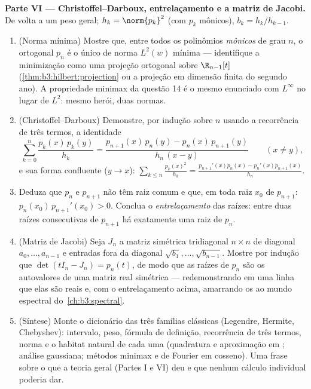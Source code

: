 \begin{problem}
\medskip
\noindent\textbf{Parte VI --- Christoffel--Darboux, entrelaçamento e a
matriz de Jacobi.} De volta a um peso geral; $h_k = \norm{p_k}^2$ (com $p_k$
mônicos), $b_k = h_k/h_{k-1}$.
\begin{enumerate}[resume]
  \item (Norma mínima) Mostre que, entre todos os polinômios
        \emph{mônicos} de grau $n$, o ortogonal $p_n$ é o único
        de norma $L^2(w)$ mínima --- identifique a minimização como
        uma projeção ortogonal sobre $\R_{n-1}[t]$ (\cref{thm:b3:hilbert:projection} ou a projeção
        em dimensão finita do segundo ano). A propriedade minimax da
        questão 14 é o mesmo enunciado com $L^\infty$ no lugar de $L^2$:
        mesmo herói, duas normas.
  \item (Christoffel--Darboux) Demonstre, por indução sobre $n$
        usando a recorrência de três termos, a identidade
        \[
        \sum_{k=0}^{n}\frac{p_k(x)\,p_k(y)}{h_k}
        = \frac{p_{n+1}(x)\,p_n(y) -
        p_n(x)\,p_{n+1}(y)}{h_n\,(x - y)}
        \qquad (x \neq y),
        \]
        e sua forma confluente ($y \to x$): $\sum_{k\leq n}\frac{p_k(x)^2}{h_k} =
        \frac{p_{n+1}'(x)p_n(x) - p_n'(x)p_{n+1}(x)}{h_n}$.
  \item Deduza que $p_n$ e $p_{n+1}$ não têm raiz comum e que, em toda
        raiz $x_0$ de $p_{n+1}$: $p_n(x_0)\,p_{n+1}'(x_0) > 0$. Conclua o \emph{entrelaçamento}
        das raízes: entre duas raízes consecutivas de $p_{n+1}$ há
        exatamente uma raiz de $p_n$.
  \item (Matriz de Jacobi) Seja $J_n$ a matriz simétrica
        tridiagonal $n\times n$ de diagonal $a_0,
        \dots, a_{n-1}$ e entradas fora da diagonal
        $\sqrt{b_1},
        \dots, \sqrt{b_{n-1}}$. Mostre por indução que $\det(tI_n - J_n) = p_n(t)$, de modo que as raízes de
        $p_n$ são os autovalores de uma matriz real simétrica ---
        redemonstrando em uma linha que elas são reais e, com o
        entrelaçamento acima, amarrando os  ao
        mundo espectral do~\cref{ch:b3:spectral}.
  \item (Síntese) Monte o dicionário das três famílias clássicas
        (Legendre, Hermite, Chebyshev): intervalo, peso, fórmula de
        definição, recorrência de três termos, norma e o habitat
        natural de cada uma (quadratura e aproximação em ;
        análise gaussiana; métodos minimax e de Fourier em cosseno).
        Uma frase sobre o que a teoria geral (Partes I e VI) deu e que
        nenhum cálculo individual poderia dar.
\end{enumerate}


\end{problem}
